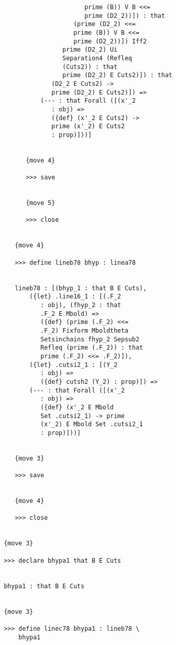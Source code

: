 \documentclass[12pt]{article}
\begin{document}
\begin{verbatim}
                               prime (B)) V B <<= 
                               prime (D2_2))]) : that 
                            (prime (D2_2) <<= 
                            prime (B)) V B <<= 
                            prime (D2_2))]) Iff2 
                         prime (D2_2) Ui 
                         Separation4 (Refleq 
                         (Cuts2)) : that 
                         prime (D2_2) E Cuts2)]) : that 
                      (D2_2 E Cuts2) -> 
                      prime (D2_2) E Cuts2)]) => 
                   (--- : that Forall ([(x'_2 
                      : obj) => 
                      ({def} (x'_2 E Cuts2) -> 
                      prime (x'_2) E Cuts2 
                      : prop)]))]


               {move 4}

               >>> save


               {move 5}

               >>> close


            {move 4}

            >>> define lineb78 bhyp : linea78


            lineb78 : [(bhyp_1 : that B E Cuts), 
                ({let} .line16_1 : [(.F_2 
                   : obj), (fhyp_2 : that 
                   .F_2 E Mbold) => 
                   ({def} (prime (.F_2) <<= 
                   .F_2) Fixform Mboldtheta 
                   Setsinchains fhyp_2 Sepsub2 
                   Refleq (prime (.F_2)) : that 
                   prime (.F_2) <<= .F_2)]), 
                ({let} .cutsi2_1 : [(Y_2 
                   : obj) => 
                   ({def} cutsh2 (Y_2) : prop)]) => 
                (--- : that Forall ([(x'_2 
                   : obj) => 
                   ({def} (x'_2 E Mbold 
                   Set .cutsi2_1) -> prime 
                   (x'_2) E Mbold Set .cutsi2_1 
                   : prop)]))]


            {move 3}

            >>> save


            {move 4}

            >>> close


         {move 3}

         >>> declare bhypa1 that B E Cuts


         bhypa1 : that B E Cuts


         {move 3}

         >>> define linec78 bhypa1 : lineb78 \
             bhypa1



\end{verbatim}
\end{document}

